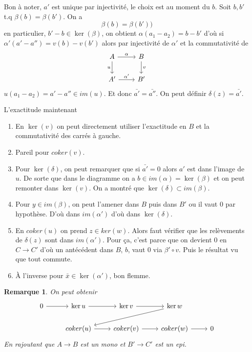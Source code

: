 \documentclass[a4paper,12pt]{book}
\theoremstyle{plain}
\newtheorem{rem}{Remarque}
\theoremstyle{definition}
\theoremstyle{remark}
\begin{document}
Bon à noter, $a'$ est unique par injectivité, le choix est au moment
du $b$. Soit $b,b'$ t.q $\beta(b)=\beta(b')$. On a 
\[\beta(b)=\beta(b'))\]
en particulier, $b'-b\in \ker(\beta)$, on obtient $\alpha(a_1-a_2)=
b-b'$ d'où si $\alpha'(a'-a'')=v(b)-v(b')$ alors par injectivité de
$\alpha'$ et la commutativité de 
\[\begin{tikzcd}
	A & B \\
	{A'} & {B'}
	\arrow["\alpha", from=1-1, to=1-2]
	\arrow["u"', from=1-1, to=2-1]
	\arrow["v", from=1-2, to=2-2]
	\arrow["{\alpha'}", from=2-1, to=2-2]
\end{tikzcd}\]
$u(a_1-a_2)=a'-a''\in im(u)$. Et donc $\bar{a'}=\bar{a''}$. On peut
définir $\delta(z)=\bar{a'}$.

L'exactitude maintenant
\begin{enumerate}
    \item En $\ker(v)$ on peut directement utiliser l'exactitude
	en $B$ et la commutativité des carrés à gauche.
    \item Pareil pour $coker(v)$.
    \item Pour $\ker(\delta)$, on peut remarquer que si $\bar{a'}=0$
	alors $a'$ est dans l'image de $u$. De sorte que dans le 
	diagramme on a $b\in im(\alpha)=\ker(\beta)$ et on peut remonter
	dans $\ker(v)$. On a montré que $\ker(\delta)\subset im(\beta)$.
    \item Pour $y\in im(\beta)$, on peut l'amener dans $B$ puis dans 
	$B'$ ou il vaut $0$ par hypothèse. D'où dans $im(\alpha')$
	d'où dans $\ker(\delta)$.
    \item En $coker(u)$ on prend $z\in ker(w)$. Alors faut vérifier
	que les relèvements de $\delta(z)$ sont dans $im(\alpha')$.
	Pour ça, c'est parce que on devient $0$ en $C\to C'$ d'où
	un antécédent dans $B$, $b$, vaut $0$ via $\beta'\circ v$. Puis
	le résultat vu que tout commute.
    \item À l'inverse pour $\bar x\in \ker(\alpha')$, bon flemme.
\end{enumerate}

\begin{rem}
    On peut obtenir 
\[\begin{tikzcd}
	0 & {\ker u} & {\ker v} & {\ker w} \\
	& {coker(u)} & {coker(v)} & {coker(w)} & 0
	\arrow[from=1-1, to=1-2]
	\arrow[from=1-2, to=1-3]
	\arrow[from=1-3, to=1-4]
	\arrow[from=1-4, to=2-2]
	\arrow[from=2-2, to=2-3]
	\arrow[from=2-3, to=2-4]
	\arrow[from=2-4, to=2-5]
\end{tikzcd}\]
    En rajoutant que $A\to B$ est un mono et $B'\to C'$ est un epi.
\end{rem}
\end{document}
